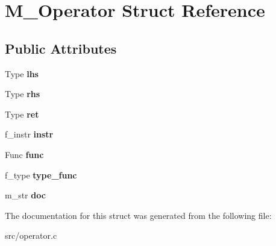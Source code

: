 \hypertarget{structM__Operator}{}\section{M\+\_\+\+Operator Struct Reference}
\label{structM__Operator}
\subsection*{Public Attributes}
\begin{DoxyCompactItemize}
\item 
\hypertarget{structM__Operator_a51795433f46f3ea35c7402cc1f41fb40}{}\label{structM__Operator_a51795433f46f3ea35c7402cc1f41fb40} 
Type {\bfseries lhs}
\item 
\hypertarget{structM__Operator_a0b4be5804fa910f82da662f9be406a43}{}\label{structM__Operator_a0b4be5804fa910f82da662f9be406a43} 
Type {\bfseries rhs}
\item 
\hypertarget{structM__Operator_a91b2ddcec311ef5b7e7e24865ff73884}{}\label{structM__Operator_a91b2ddcec311ef5b7e7e24865ff73884} 
Type {\bfseries ret}
\item 
\hypertarget{structM__Operator_aefc91b6e14508ea17d33c9be18ad01d8}{}\label{structM__Operator_aefc91b6e14508ea17d33c9be18ad01d8} 
f\+\_\+instr {\bfseries instr}
\item 
\hypertarget{structM__Operator_a2c388d11d04cea088574043723ba8a4f}{}\label{structM__Operator_a2c388d11d04cea088574043723ba8a4f} 
Func {\bfseries func}
\item 
\hypertarget{structM__Operator_a3a9ad40d915813eb49422e858c027673}{}\label{structM__Operator_a3a9ad40d915813eb49422e858c027673} 
f\+\_\+type {\bfseries type\+\_\+func}
\item 
\hypertarget{structM__Operator_a47ef1540e5eb6916553740fa1f0bca42}{}\label{structM__Operator_a47ef1540e5eb6916553740fa1f0bca42} 
m\+\_\+str {\bfseries doc}
\end{DoxyCompactItemize}


The documentation for this struct was generated from the following file\+:\begin{DoxyCompactItemize}
\item 
src/operator.\+c\end{DoxyCompactItemize}
